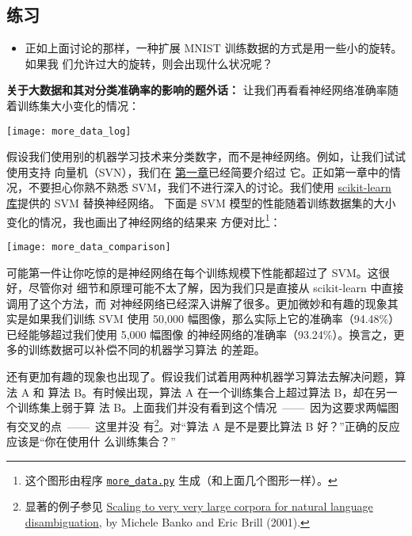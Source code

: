 \subsection*{练习}

\begin{itemize}
\item 正如上面讨论的那样，一种扩展 MNIST 训练数据的方式是用一些小的旋转。如果我
  们允许过大的旋转，则会出现什么状况呢？
\end{itemize}

\textbf{关于大数据和其对分类准确率的影响的题外话：} 让我们再看看神经网络准确率随
着训练集大小变化的情况：
\begin{center}
\texttt{[image: more\_data\_log]}
\end{center}

假设我们使用别的机器学习技术来分类数字，而不是神经网络。例如，让我们试试使用支持
向量机（SVN），我们在%
\hyperref[ch:UsingNeuralNetsToRecognizeHandwrittenDigits]{第一章}已经简要介绍过
它。正如第一章中的情况，不要担心你熟不熟悉 SVM，我们不进行深入的讨论。我们使用
\href{http://scikit-learn.org/stable/}{scikit-learn 库}提供的 SVM 替换神经网络。
下面是 SVM 模型的性能随着训练数据集的大小变化的情况，我也画出了神经网络的结果来
方便对比\footnote{这个图形由程序
  \href{https://github.com/mnielsen/neural-networks-and-deep-learning/blob/master/fig/more_data.py}{\lstinline!more_data.py!}
  生成（和上面几个图形一样）。}：
\begin{center}
\texttt{[image: more\_data\_comparison]}
\end{center}

可能第一件让你吃惊的是神经网络在每个训练规模下性能都超过了 SVM。这很好，尽管你对
细节和原理可能不太了解，因为我们只是直接从 scikit-learn 中直接调用了这个方法，而
对神经网络已经深入讲解了很多。更加微妙和有趣的现象其实是如果我们训练 SVM 使用
50,000 幅图像，那么实际上它的准确率（94.48\%）已经能够超过我们使用 5,000 幅图像
的神经网络的准确率（93.24\%）。换言之，更多的训练数据可以补偿不同的机器学习算法
的差距。

还有更加有趣的现象也出现了。假设我们试着用两种机器学习算法去解决问题，算法 A 和
算法 B。有时候出现，算法 A 在一个训练集合上超过算法 B，却在另一个训练集上弱于算
法 B。上面我们并没有看到这个情况~——~因为这要求两幅图有交叉的点~——~这里并没
有\footnote{显著的例子参见
  \href{http://dx.doi.org/10.3115/1073012.1073017}{Scaling to very very large
    corpora for natural language disambiguation}, by Michele Banko and Eric
  Brill (2001).}。对“算法 A 是不是要比算法 B 好？”正确的反应应该是“你在使用什
么训练集合？”


